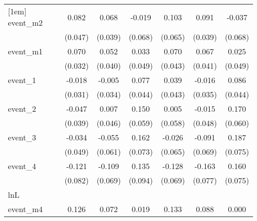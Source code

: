 {\begin{tabular}{l*{6}{c}}
[1em]
event\_m2    &       0.082         &       0.068         &      -0.019         &       0.103         &       0.091\sym{*}  &      -0.037         \\
            &     (0.047)         &     (0.039)         &     (0.068)         &     (0.065)         &     (0.039)         &     (0.068)         \\
[1em]
event\_m1    &       0.070\sym{*}  &       0.052         &       0.033         &       0.070         &       0.067         &       0.025         \\
            &     (0.032)         &     (0.040)         &     (0.049)         &     (0.043)         &     (0.041)         &     (0.049)         \\
[1em]
event\_1     &      -0.018         &      -0.005         &       0.077         &       0.039         &      -0.016         &       0.086         \\
            &     (0.031)         &     (0.034)         &     (0.044)         &     (0.043)         &     (0.035)         &     (0.044)         \\
[1em]
event\_2     &      -0.047         &       0.007         &       0.150\sym{*}  &       0.005         &      -0.015         &       0.170\sym{**} \\
            &     (0.039)         &     (0.046)         &     (0.059)         &     (0.058)         &     (0.048)         &     (0.060)         \\
[1em]
event\_3     &      -0.034         &      -0.055         &       0.162\sym{*}  &      -0.026         &      -0.091         &       0.187\sym{*}  \\
            &     (0.049)         &     (0.061)         &     (0.073)         &     (0.065)         &     (0.069)         &     (0.075)         \\
[1em]
event\_4     &      -0.121         &      -0.109         &       0.135         &      -0.128         &      -0.163\sym{*}  &       0.160\sym{*}  \\
            &     (0.082)         &     (0.069)         &     (0.094)         &     (0.069)         &     (0.077)         &     (0.075)         \\
\hline
lnL         &                     &                     &                     &                     &                     &                     \\
event\_m4    &       0.126\sym{**} &       0.072         &       0.019         &       0.133\sym{*}  &       0.088\sym{*}  &       0.000         \\

\end{tabular}}

